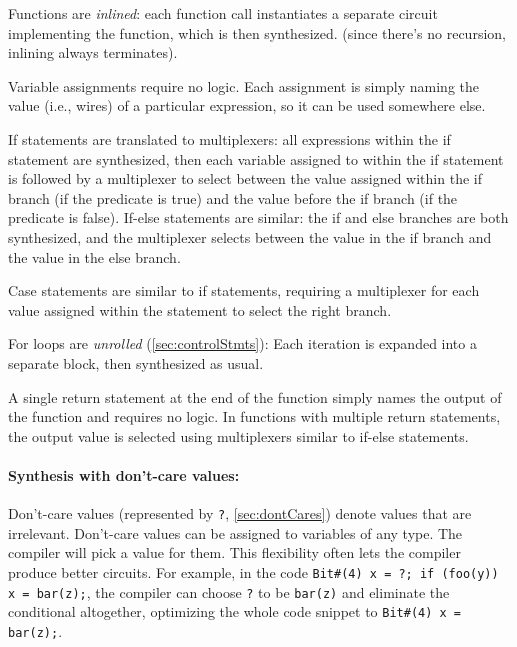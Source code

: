 \hfill \vspace{-2.35em}  %
\begin{compactitem}
\item Functions are \emph{inlined}: each function call instantiates a separate circuit implementing the function, which is then synthesized.
  (since there's no recursion, inlining always terminates).
\item Variable assignments require no logic. Each assignment is simply naming the value (i.e., wires) of a particular expression,
  so it can be used somewhere else.
\item If statements are translated to multiplexers: all expressions within the if statement are synthesized,
  then each variable assigned to within the if statement is followed by a multiplexer
  to select between the value assigned within the if branch (if the predicate is true)
  and the value before the if branch (if the predicate is false).
  If-else statements are similar: the if and else branches are both synthesized,
  and the multiplexer selects between the value in the if branch and the value in the else branch.
\item Case statements are similar to if statements, requiring a multiplexer for each value assigned
  within the statement to select the right branch.
\item For loops are \emph{unrolled} (\autoref{sec:controlStmts}): Each iteration is expanded into a separate block, then synthesized as usual.
\item A single return statement at the end of the function simply names the output of the function and requires no logic.
  In functions with multiple return statements, the output value is selected using multiplexers similar to if-else statements.
\end{compactitem}

\paragraph{Synthesis with don't-care values:}
Don't-care values (represented by \texttt{?}, \autoref{sec:dontCares}) denote values that are irrelevant.
Don't-care values can be assigned to variables of any type. The compiler will pick a value for them.
This flexibility often lets the compiler produce better circuits.
For example, in the code \verb|Bit#(4) x = ?; if (foo(y)) x = bar(z);|,
the compiler can choose \verb|?| to be \verb|bar(z)| and eliminate the conditional altogether,
optimizing the whole code snippet to \verb|Bit#(4) x = bar(z);|.

